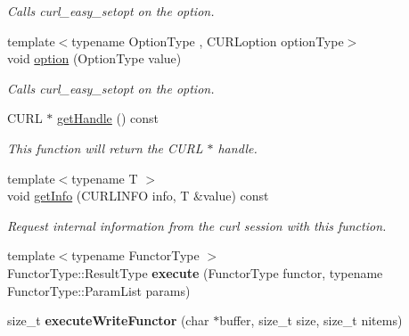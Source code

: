 \begin{DoxyCompactItemize}
\begin{DoxyCompactList}\small\item\em Calls curl\-\_\-easy\-\_\-setopt on the option. \end{DoxyCompactList}\item 
\hypertarget{classcurlpp_1_1internal_1_1CurlHandle_af7cf67e4dfc41b2da23a6005b0f396d3}{{\footnotesize template$<$typename Option\-Type , C\-U\-R\-Loption option\-Type$>$ }\\void \hyperlink{classcurlpp_1_1internal_1_1CurlHandle_af7cf67e4dfc41b2da23a6005b0f396d3}{option} (Option\-Type value)}\label{classcurlpp_1_1internal_1_1CurlHandle_af7cf67e4dfc41b2da23a6005b0f396d3}

\begin{DoxyCompactList}\small\item\em Calls curl\-\_\-easy\-\_\-setopt on the option. \end{DoxyCompactList}\item 
C\-U\-R\-L $\ast$ \hyperlink{classcurlpp_1_1internal_1_1CurlHandle_a219dded6f057d576ec1a1eb76061e0c0}{get\-Handle} () const 
\begin{DoxyCompactList}\small\item\em This function will return the C\-U\-R\-L $\ast$ handle. \end{DoxyCompactList}\item 
{\footnotesize template$<$typename T $>$ }\\void \hyperlink{classcurlpp_1_1internal_1_1CurlHandle_ad217ec54215cf880b474a1e1249b5f4e}{get\-Info} (C\-U\-R\-L\-I\-N\-F\-O info, T \&value) const 
\begin{DoxyCompactList}\small\item\em Request internal information from the curl session with this function. \end{DoxyCompactList}\item 
\hypertarget{classcurlpp_1_1internal_1_1CurlHandle_ab4a680ad19c629823ed6baed2582f1b7}{{\footnotesize template$<$typename Functor\-Type $>$ }\\Functor\-Type\-::\-Result\-Type {\bfseries execute} (Functor\-Type functor, typename Functor\-Type\-::\-Param\-List params)}\label{classcurlpp_1_1internal_1_1CurlHandle_ab4a680ad19c629823ed6baed2582f1b7}

\item 
\hypertarget{classcurlpp_1_1internal_1_1CurlHandle_ac62f315ca3a5150786a06914b1858daa}{size\-\_\-t {\bfseries execute\-Write\-Functor} (char $\ast$buffer, size\-\_\-t size, size\-\_\-t nitems)}\label{classcurlpp_1_1internal_1_1CurlHandle_ac62f315ca3a5150786a06914b1858daa}


\end{DoxyCompactItemize}
